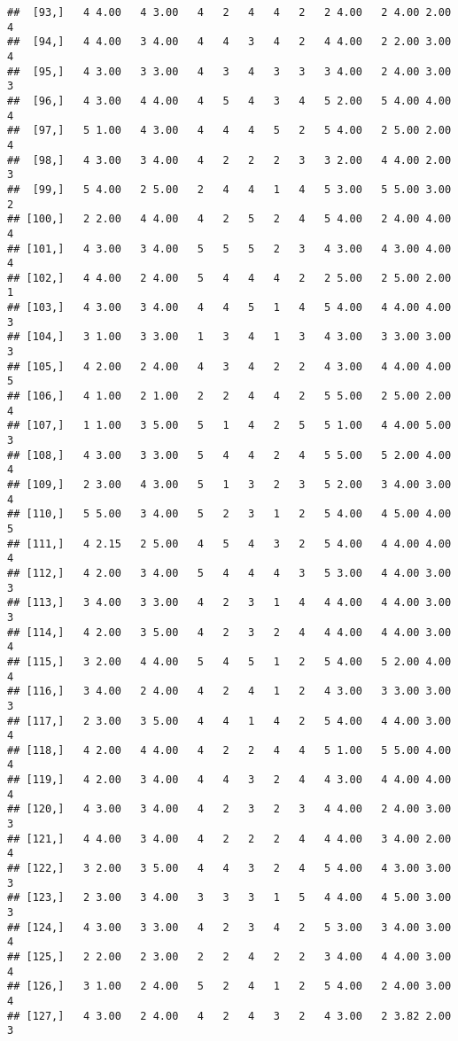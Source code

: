 \documentclass[]{article}
\begin{document}
\begin{verbatim}
##  [93,]   4 4.00   4 3.00   4   2   4   4   2   2 4.00   2 4.00 2.00   4
##  [94,]   4 4.00   3 4.00   4   4   3   4   2   4 4.00   2 2.00 3.00   4
##  [95,]   4 3.00   3 3.00   4   3   4   3   3   3 4.00   2 4.00 3.00   3
##  [96,]   4 3.00   4 4.00   4   5   4   3   4   5 2.00   5 4.00 4.00   4
##  [97,]   5 1.00   4 3.00   4   4   4   5   2   5 4.00   2 5.00 2.00   4
##  [98,]   4 3.00   3 4.00   4   2   2   2   3   3 2.00   4 4.00 2.00   3
##  [99,]   5 4.00   2 5.00   2   4   4   1   4   5 3.00   5 5.00 3.00   2
## [100,]   2 2.00   4 4.00   4   2   5   2   4   5 4.00   2 4.00 4.00   4
## [101,]   4 3.00   3 4.00   5   5   5   2   3   4 3.00   4 3.00 4.00   4
## [102,]   4 4.00   2 4.00   5   4   4   4   2   2 5.00   2 5.00 2.00   1
## [103,]   4 3.00   3 4.00   4   4   5   1   4   5 4.00   4 4.00 4.00   3
## [104,]   3 1.00   3 3.00   1   3   4   1   3   4 3.00   3 3.00 3.00   3
## [105,]   4 2.00   2 4.00   4   3   4   2   2   4 3.00   4 4.00 4.00   5
## [106,]   4 1.00   2 1.00   2   2   4   4   2   5 5.00   2 5.00 2.00   4
## [107,]   1 1.00   3 5.00   5   1   4   2   5   5 1.00   4 4.00 5.00   3
## [108,]   4 3.00   3 3.00   5   4   4   2   4   5 5.00   5 2.00 4.00   4
## [109,]   2 3.00   4 3.00   5   1   3   2   3   5 2.00   3 4.00 3.00   4
## [110,]   5 5.00   3 4.00   5   2   3   1   2   5 4.00   4 5.00 4.00   5
## [111,]   4 2.15   2 5.00   4   5   4   3   2   5 4.00   4 4.00 4.00   4
## [112,]   4 2.00   3 4.00   5   4   4   4   3   5 3.00   4 4.00 3.00   3
## [113,]   3 4.00   3 3.00   4   2   3   1   4   4 4.00   4 4.00 3.00   3
## [114,]   4 2.00   3 5.00   4   2   3   2   4   4 4.00   4 4.00 3.00   4
## [115,]   3 2.00   4 4.00   5   4   5   1   2   5 4.00   5 2.00 4.00   4
## [116,]   3 4.00   2 4.00   4   2   4   1   2   4 3.00   3 3.00 3.00   3
## [117,]   2 3.00   3 5.00   4   4   1   4   2   5 4.00   4 4.00 3.00   4
## [118,]   4 2.00   4 4.00   4   2   2   4   4   5 1.00   5 5.00 4.00   4
## [119,]   4 2.00   3 4.00   4   4   3   2   4   4 3.00   4 4.00 4.00   4
## [120,]   4 3.00   3 4.00   4   2   3   2   3   4 4.00   2 4.00 3.00   3
## [121,]   4 4.00   3 4.00   4   2   2   2   4   4 4.00   3 4.00 2.00   4
## [122,]   3 2.00   3 5.00   4   4   3   2   4   5 4.00   4 3.00 3.00   3
## [123,]   2 3.00   3 4.00   3   3   3   1   5   4 4.00   4 5.00 3.00   3
## [124,]   4 3.00   3 3.00   4   2   3   4   2   5 3.00   3 4.00 3.00   4
## [125,]   2 2.00   2 3.00   2   2   4   2   2   3 4.00   4 4.00 3.00   4
## [126,]   3 1.00   2 4.00   5   2   4   1   2   5 4.00   2 4.00 3.00   4
## [127,]   4 3.00   2 4.00   4   2   4   3   2   4 3.00   2 3.82 2.00   3

\end{verbatim}
\end{document}
